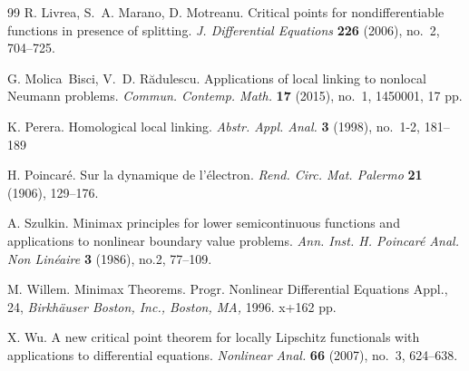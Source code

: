 \documentclass{article}
\theoremstyle{definition}
\begin{document}
\begin{thebibliography}{99}
    R. Livrea, S.~A. Marano, D. Motreanu. Critical points for nondifferentiable functions in presence of splitting. \textsl{J. Differential Equations} {\bf 226} (2006), no.~2, 704--725.

     G. Molica~Bisci, V.~D. R\u adulescu. Applications of local linking to nonlocal Neumann problems. \textsl{Commun. Contemp. Math.} {\bf 17} (2015), no.~1, 1450001, 17 pp.
    
     K. Perera. Homological local linking. \textsl{Abstr. Appl. Anal.} {\bf 3} (1998), no.~1-2, 181--189
			
	 H. Poincar\'e. Sur la dynamique de l'\'electron. \textsl{Rend. Circ. Mat. Palermo} {\bf 21} (1906), 129--176.
			
	 A. Szulkin. Minimax principles for lower semicontinuous functions and applications to nonlinear boundary value problems. \textsl{Ann. Inst. H. Poincar\'e Anal. Non Lin\'eaire} {\bf 3} (1986), no.2, 77--109.
	    
	 M. Willem. Minimax Theorems. Progr. Nonlinear Differential Equations Appl., 24, \textsl{Birkh\"auser Boston, Inc., Boston, MA,} 1996. x+162 pp. 

     X. Wu. A new critical point theorem for locally Lipschitz functionals with applications to differential equations. \textsl{Nonlinear Anal.} {\bf 66} (2007), no.~3, 624--638.
			
			
\end{thebibliography}
\end{document}
